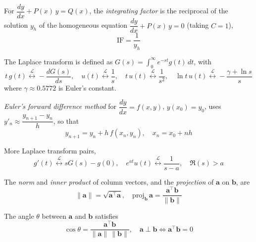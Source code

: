 \item For $\dfrac{dy}{dx} + P(x)\,y = Q(x)$, the \emph{integrating factor} is the reciprocal of the solution $y_h$ of the homogeneous equation $\dfrac{dy}{dx} + P(x)\,y = 0$ (taking $C=1$),
\begin{equation}
\text{IF} = \frac{1}{y_h}
\label{c12eq:ifactor}
\end{equation}

\item The Laplace transform is defined as $G(s) = \displaystyle\int_0^\infty e^{-st}g(t)\,dt$, with
\begin{equation}
t\,g(t) \overset{\mathcal{L}}{\longleftrightarrow} -\frac{dG(s)}{ds}, \quad
u(t) \overset{\mathcal{L}}{\longleftrightarrow} \frac{1}{s}, \quad
t\,u(t) \overset{\mathcal{L}}{\longleftrightarrow} \frac{1}{s^2}, \quad
\ln t\,u(t) \overset{\mathcal{L}}{\longleftrightarrow} -\frac{\gamma + \ln s}{s}
\label{c12eq:laplace}
\end{equation}
where $\gamma \approx 0.5772$ is Euler's constant.

\item \emph{Euler's forward difference method} for $\dfrac{dy}{dx} = f(x,y)$, $y(x_0) = y_0$, uses $y'_n \approx \dfrac{y_{n+1}-y_n}{h}$, so that
\begin{equation}
y_{n+1} = y_n + h\,f(x_n, y_n), \quad x_n = x_0 + nh
\label{c12eq:eulerfwd}
\end{equation}

\item More Laplace transform pairs,
\begin{equation}
g'(t) \overset{\mathcal{L}}{\longleftrightarrow} sG(s) - g(0), \quad
e^{at}u(t) \overset{\mathcal{L}}{\longleftrightarrow} \frac{1}{s-a}, \quad \Re(s) > a
\label{c12eq:laplace2}
\end{equation}

\item The \emph{norm} and \emph{inner product} of column vectors, and the \emph{projection} of $\mathbf{a}$ on $\mathbf{b}$, are
\begin{equation}
\|\mathbf{a}\| = \sqrt{\mathbf{a}^{\top}\mathbf{a}}, \quad
\text{proj}_{\mathbf{b}}\,\mathbf{a} = \frac{\mathbf{a}^{\top}\mathbf{b}}{\|\mathbf{b}\|}
\label{c12eq:proj}
\end{equation}

\item The angle $\theta$ between $\mathbf{a}$ and $\mathbf{b}$ satisfies
\begin{equation}
\cos\theta = \frac{\mathbf{a}^{\top}\mathbf{b}}{\|\mathbf{a}\|\,\|\mathbf{b}\|}, \quad
\mathbf{a} \perp \mathbf{b} \iff \mathbf{a}^{\top}\mathbf{b} = 0
\label{c12eq:angle}
\end{equation}

